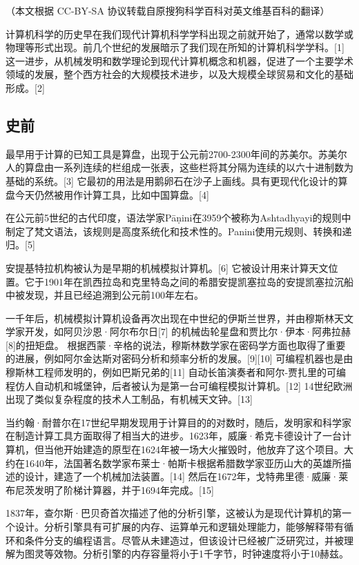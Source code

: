 
（本文根据 CC-BY-SA 协议转载自原搜狗科学百科对英文维基百科的翻译）

计算机科学的历史早在我们现代计算机科学学科出现之前就开始了，通常以数学或物理等形式出现。前几个世纪的发展暗示了我们现在所知的计算机科学学科。[1] 这一进步，从机械发明和数学理论到现代计算机概念和机器，促进了一个主要学术领域的发展，整个西方社会的大规模技术进步，以及大规模全球贸易和文化的基础形成。[2]

\subsection{史前}
最早用于计算的已知工具是算盘，出现于公元前2700-2300年间的苏美尔。苏美尔人的算盘由一系列连续的栏组成一张表，这些栏将其分隔为连续的以六十进制数为基础的系统。[3] 它最初的用法是用鹅卵石在沙子上画线。具有更现代化设计的算盘今天仍然被用作计算工具，比如中国算盘。[4]

在公元前5世纪的古代印度，语法学家Pāṇini在3959个被称为Ashtadhyayi的规则中制定了梵文语法，该规则是高度系统化和技术性的。Panini使用元规则、转换和递归。[5]

安提基特拉机构被认为是早期的机械模拟计算机。[6] 它被设计用来计算天文位置。它于1901年在凯西拉岛和克里特岛之间的希腊安提凯塞拉岛的安提凯塞拉沉船中被发现，并且已经追溯到公元前100年左右。

一千年后，机械模拟计算机设备再次出现在中世纪的伊斯兰世界，并由穆斯林天文学家开发，如阿贝沙恩·阿尔布尔日[7] 的机械齿轮星盘和贾比尔·伊本·阿弗拉赫[8]的扭矩盘。 根据西蒙·辛格的说法，穆斯林数学家在密码学方面也取得了重要的进展，例如阿尔金达斯对密码分析和频率分析的发展。[9][10] 可编程机器也是由穆斯林工程师发明的，例如巴斯兄弟的[11] 自动长笛演奏者和阿尔-贾扎里的可编程仿人自动机和城堡钟，后者被认为是第一台可编程模拟计算机。[12] 14世纪欧洲出现了类似复杂程度的技术人工制品，有机械天文钟。[13]

当约翰·耐普尔在17世纪早期发现用于计算目的的对数时，随后，发明家和科学家在制造计算工具方面取得了相当大的进步。1623年，威廉·希克卡德设计了一台计算机，但当他开始建造的原型在1624年被一场大火摧毁时，他放弃了这个项目。大约在1640年，法国著名数学家布莱士·帕斯卡根据希腊数学家亚历山大的英雄所描述的设计，建造了一个机械加法装置。[14] 然后在1672年，戈特弗里德·威廉·莱布尼茨发明了阶梯计算器，并于1694年完成。[15]

1837年，查尔斯·巴贝奇首次描述了他的分析引擎，这被认为是现代计算机的第一个设计。分析引擎具有可扩展的内存、运算单元和逻辑处理能力，能够解释带有循环和条件分支的编程语言。尽管从未建造过，但该设计已经被广泛研究过，并被理解为图灵等效物。分析引擎的内存容量将小于1千字节，时钟速度将小于10赫兹。

